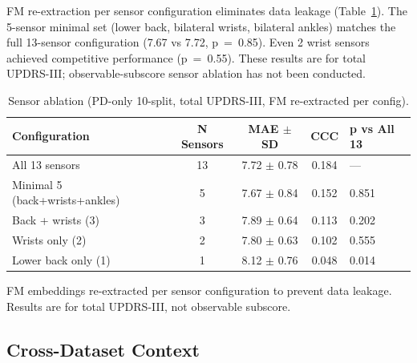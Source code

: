\documentclass[11pt]{article}
\begin{document}
FM re-extraction per sensor configuration eliminates data leakage (Table~\ref{tab:sensor}). The 5-sensor minimal set (lower back, bilateral wrists, bilateral ankles) matches the full 13-sensor configuration (7.67 vs 7.72, p~=~0.85). Even 2 wrist sensors achieved competitive performance (p~=~0.55). These results are for total UPDRS-III; observable-subscore sensor ablation has not been conducted.
\begin{table}[H]
\centering
\caption{Sensor ablation (PD-only 10-split, total UPDRS-III, FM re-extracted per config).}
\label{tab:sensor}
\begin{tabular}{lcccl}
\toprule
Configuration & N Sensors & MAE $\pm$ SD & CCC & p vs All 13 \\
\midrule
All 13 sensors & 13 & 7.72 $\pm$ 0.78 & 0.184 & --- \\
Minimal 5 (back+wrists+ankles) & 5 & 7.67 $\pm$ 0.84 & 0.152 & 0.851 \\
Back + wrists (3) & 3 & 7.89 $\pm$ 0.64 & 0.113 & 0.202 \\
Wrists only (2) & 2 & 7.80 $\pm$ 0.63 & 0.102 & 0.555 \\
Lower back only (1) & 1 & 8.12 $\pm$ 0.76 & 0.048 & 0.014 \\
\bottomrule
\end{tabular}

\smallskip
\footnotesize{FM embeddings re-extracted per sensor configuration to prevent data leakage. Results are for total UPDRS-III, not observable subscore.}
\end{table}

\subsection{Cross-Dataset Context}
\end{document}
